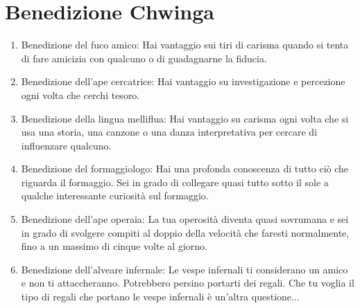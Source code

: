 \documentclass{article}
\begin{document}
\section{Benedizione Chwinga}
\begin{enumerate}
    \item Benedizione del fuco amico: Hai vantaggio sui tiri di carisma quando si tenta di fare amicizia con qualcuno o di guadagnarne la fiducia.
    \item Benedizione dell’ape cercatrice: Hai vantaggio su investigazione e percezione ogni volta che cerchi tesoro.
    \item Benedizione della lingua melliflua: Hai vantaggio su carisma ogni volta che si usa una storia, una canzone o una danza interpretativa per cercare di influenzare qualcuno.
    \item Benedizione del formaggiologo: Hai una profonda conoscenza di tutto ciò che riguarda il formaggio. Sei in grado di collegare quasi tutto sotto il sole a qualche interessante curiosità sul formaggio.
    \item Benedizione dell’ape operaia: La tua operosità diventa quasi sovrumana e sei in grado di svolgere compiti al doppio della velocità che faresti normalmente, fino a un massimo di cinque volte al giorno.
    \item Benedizione dell’alveare infernale: Le vespe infernali ti considerano un amico e non ti attaccheranno. Potrebbero persino portarti dei regali. Che tu voglia il tipo di regali che portano le vespe infernali è un'altra questione...
\end{enumerate}
\end{document}
